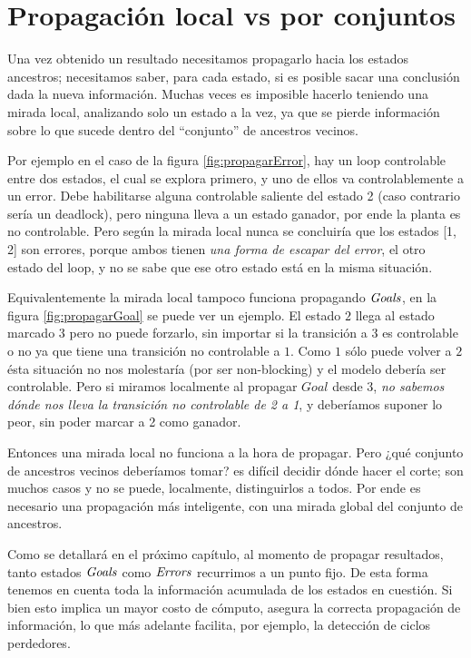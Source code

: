 \section{Propagación local vs por conjuntos}\label{propagacionLocal}

Una vez obtenido un resultado necesitamos propagarlo hacia los estados ancestros; necesitamos saber, para cada estado, si es posible sacar una conclusión dada la nueva información. Muchas veces es imposible hacerlo teniendo una mirada local, analizando solo un estado a la vez, ya que se pierde información sobre lo que sucede dentro del ``conjunto'' de ancestros vecinos.

Por ejemplo en el caso de la figura \ref{fig:propagarError}, hay un loop controlable entre dos estados, el cual se explora primero, y uno de ellos va controlablemente a un error. Debe habilitarse alguna controlable saliente del estado 2 (caso contrario sería un deadlock), pero ninguna lleva a un estado ganador, por ende la planta es no controlable. Pero según la mirada local nunca se concluiría que los estados [1, 2] son errores, porque ambos tienen \textit{una forma de escapar del error}, el otro estado del loop, y no se sabe que ese otro estado está en la misma situación. 

Equivalentemente la mirada local tampoco funciona propagando $\mathit{Goals}$, en la figura \ref{fig:propagarGoal} se puede ver un ejemplo. El estado $2$ llega al estado marcado $3$ pero no puede forzarlo, sin importar si la transición a $3$ es controlable o no ya que tiene una transición no controlable a $1$. Como $1$ sólo puede volver a $2$ ésta situación no nos molestaría (por ser non-blocking) y el modelo debería ser controlable. Pero si miramos localmente al propagar $Goal$ desde $3$, \textit{no sabemos dónde nos lleva la transición no controlable de 2 a 1}, y deberíamos suponer lo peor, sin poder marcar a 2 como ganador.

Entonces una mirada local no funciona a la hora de propagar. Pero ¿qué conjunto de ancestros vecinos deberíamos tomar? es difícil decidir dónde hacer el corte; son muchos casos y no se puede, localmente, distinguirlos a todos. Por ende es necesario una propagación más inteligente, con una mirada global del conjunto de ancestros.

Como se detallará en el próximo capítulo, al momento de propagar resultados, tanto estados $\mathit{Goals}$ como $\mathit{Errors}$ recurrimos a un punto fijo. De esta forma tenemos en cuenta toda la información acumulada de los estados en cuestión. Si bien esto implica un mayor costo de cómputo, asegura la correcta propagación de información, lo que más adelante facilita, por ejemplo, la detección de ciclos perdedores.\\

